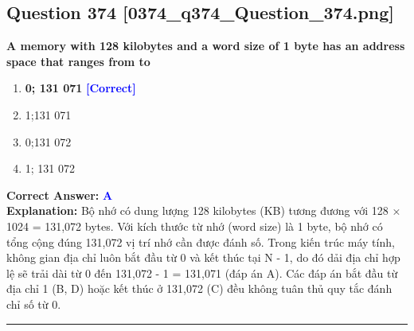 \documentclass[11pt,a4paper]{article}
\begin{document}
\begin{minipage}{\textwidth}
\subsection*{Question 374 \quad \footnotesize{[0374\_q374\_Question\_374.png]}}
\noindent \textbf{A memory with 128 kilobytes and a word size of 1 byte has an address space that ranges from to}

\begin{enumerate}[label=\Alph*.]
    \item \textbf{0; 131 071} \hfill \textcolor{blue}{\textbf{[Correct]}}
    \item 1;131 071
    \item 0;131 072
    \item 1; 131 072
\end{enumerate}

\noindent \textbf{Correct Answer:} \textcolor{blue}{\textbf{A}} \\[2pt]
\noindent \textbf{Explanation:} Bộ nhớ có dung lượng 128 kilobytes (KB) tương đương với 128 × 1024 = 131,072 bytes. Với kích thước từ nhớ (word size) là 1 byte, bộ nhớ có tổng cộng đúng 131,072 vị trí nhớ cần được đánh số. Trong kiến trúc máy tính, không gian địa chỉ luôn bắt đầu từ 0 và kết thúc tại N - 1, do đó dải địa chỉ hợp lệ sẽ trải dài từ 0 đến 131,072 - 1 = 131,071 (đáp án A). Các đáp án bắt đầu từ địa chỉ 1 (B, D) hoặc kết thúc ở 131,072 (C) đều không tuân thủ quy tắc đánh chỉ số từ 0.

\par\vspace{0.3cm}
\hrule
\vspace{0.3cm}
\end{minipage}
\end{document}
